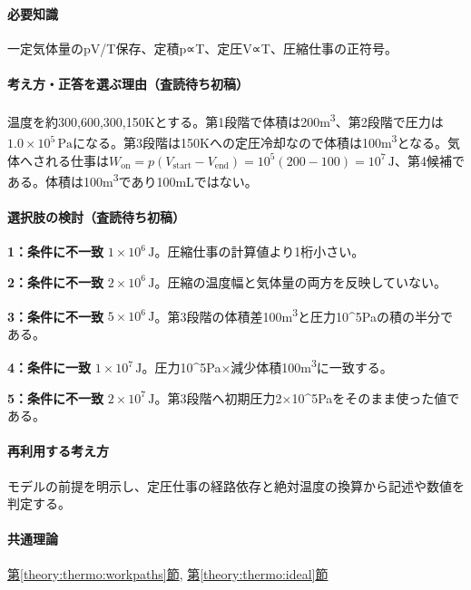 \paragraph{必要知識} 一定気体量のpV/T保存、定積p∝T、定圧V∝T、圧縮仕事の正符号。

\paragraph{考え方・正答を選ぶ理由（査読待ち初稿）} 温度を約300,600,300,150Kとする。第1段階で体積は200m\textsuperscript{3}、第2段階で圧力は\(1.0\times10^5\,\mathrm{Pa}\)になる。第3段階は150Kへの定圧冷却なので体積は100m\textsuperscript{3}となる。気体へされる仕事は\(W_{\mathrm{on}}=p(V_{\mathrm{start}}-V_{\mathrm{end}})=10^5(200-100)=10^7\,\mathrm{J}\)、第4候補である。体積は100m\textsuperscript{3}であり100mLではない。

\paragraph{選択肢の検討（査読待ち初稿）}\mbox{}\par

\noindent\textbf{1：条件に不一致} \(1\times10^6\,\mathrm{J}\)。圧縮仕事の計算値より1桁小さい。\par

\noindent\textbf{2：条件に不一致} \(2\times10^6\,\mathrm{J}\)。圧縮の温度幅と気体量の両方を反映していない。\par

\noindent\textbf{3：条件に不一致} \(5\times10^6\,\mathrm{J}\)。第3段階の体積差100m\textsuperscript{3}と圧力10\textasciicircum{}5Paの積の半分である。\par

\noindent\textbf{4：条件に一致} \(1\times10^7\,\mathrm{J}\)。圧力10\textasciicircum{}5Pa×減少体積100m\textsuperscript{3}に一致する。\par

\noindent\textbf{5：条件に不一致} \(2\times10^7\,\mathrm{J}\)。第3段階へ初期圧力2×10\textasciicircum{}5Paをそのまま使った値である。\par

\paragraph{再利用する考え方} モデルの前提を明示し、定圧仕事の経路依存と絶対温度の換算から記述や数値を判定する。

\paragraph{共通理論} \hyperref[theory:thermo:workpaths]{第\ref*{theory:thermo:workpaths}節}, \hyperref[theory:thermo:ideal]{第\ref*{theory:thermo:ideal}節}

